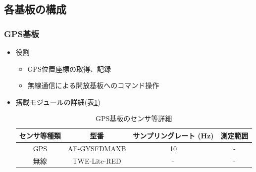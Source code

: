 \documentclass[a4paper,11pt,uplatex]{jsarticle}
\begin{document}
\subsection{各基板の構成}

\subsubsection{GPS基板}
\begin{itemize}
	\item 役割
	      \begin{itemize}
		      \item GPS位置座標の取得、記録
		      \item 無線通信による開放基板へのコマンド操作
	      \end{itemize}

	\item 搭載モジュールの詳細(表\ref{tab:com_detail})
	      \begin{table}[H]
		      \centering
		      \caption{GPS基板のセンサ等詳細}
		      \begin{tabular}{cccc} \toprule
			      センサ等種類 & 型番           & サンプリングレート (\si{Hz}) & 測定範囲 \\ \midrule
			      GPS    & AE-GYSFDMAXB & 10                  & -    \\
			      無線     & TWE-Lite-RED & -                   & -    \\
			      \bottomrule
		      \end{tabular}
		      \label{tab:com_detail}
	      \end{table}
\end{itemize}
\end{document}
